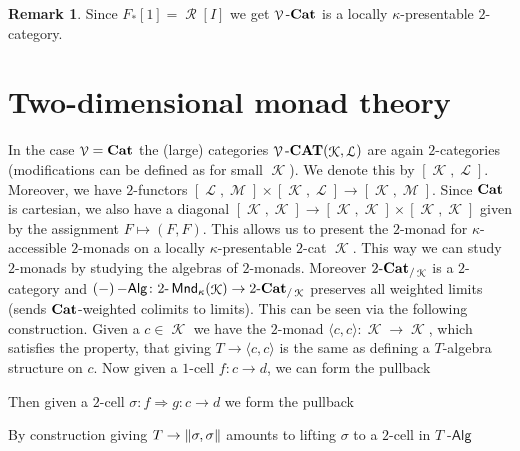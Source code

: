 \documentclass[a4paper,11pt,oneside,openany]{scrbook}
\newcommand{\catname}[1]{{\normalfont\textbf{#1}}}
\DeclareMathOperator{\Alg}{-\mathsf{Alg}}
\newcommand{\Cat}{\catname{Cat}}
\newcommand{\CAT}{\catname{CAT}}
\newcommand{\from}{\colon}
\DeclareMathOperator{\K}{\mathcal{K}}
\DeclareMathOperator{\V}{\mathcal{V}}
\DeclareMathOperator{\Rf}{\mathcal{R}}
\DeclareMathOperator{\Lf}{\mathcal{L}}
\DeclareMathOperator{\M}{\mathcal{M}}
\DeclareMathOperator{\Mnd}{\mathsf{Mnd}}
\theoremstyle{definition}
\theoremstyle{definition}
\newtheorem{rmk}[thm]{Remark}
\begin{document}
\begin{rmk}
   Since $F_{\ast}[1] = \Rf[I]$ we get $\V\text{-}\Cat$ is a locally $\kappa$-presentable $2$-category. 
\end{rmk}

\section{Two-dimensional monad theory}

In the case $\V=\Cat$ the (large) categories $\V\text{-}\CAT(\K,\Lf)$ are again $2$-categories (modifications can be defined as for small $\K$). We denote 
this by $[\K,\Lf]$. Moreover, we have $2$-functors $[\Lf,\M] \times [\K,\Lf] \to [\K,\M]$. Since $\Cat$ is cartesian, we also have a diagonal 
$[\K,\K] \to [\K,\K] \times [\K,\K]$ given by the assignment $F \mapsto (F,F)$. This allows us to present the $2$-monad for $\kappa$-accessible $2$-monads on
a locally $\kappa$-presentable $2$-cat $\K$. This way we can study $2$-monads by studying the algebras of $2$-monads. Moreover $2\text{-}\Cat_{/\K}$ is 
a $2$-category and $(-)\Alg \from 2\text{-}\Mnd_{\kappa}(\K) \to 2\text{-}\Cat_{/\K}$ preserves all weighted limits (sends $\Cat$-weighted colimits to limits). 
This can be seen via the following construction. Given a $c \in \K$ we have the $2$-monad $\langle c,c \rangle \from \K \to \K$, which satisfies the property, that 
giving $T \to \langle c,c \rangle$ is the same as defining a $T$-algebra structure on $c$. Now given a $1$-cell $f \from c \to d$, we can form the pullback
   \begin{center}
   \end{center}
Then given a $2$-cell $\sigma \from f \Rightarrow g \from c \to d$ we form the pullback 
   \begin{center}
   \end{center}
By construction giving $T \to \Arrowvert \sigma,\sigma \Arrowvert$ amounts to lifting $\sigma$ to a $2$-cell in $T\Alg$
   \begin{center}
   \end{center}
   
\end{document}

